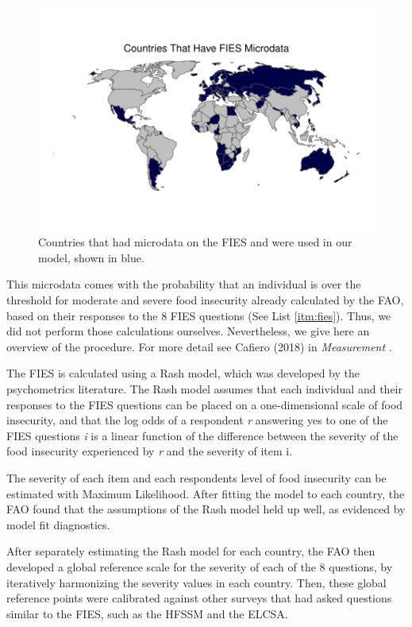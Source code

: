 \documentclass{article}
\begin{document}
\begin{figure}[H]
  \centering
  \includegraphics[width=\linewidth]{img/FIES_Countries.pdf}
  \caption{Countries that had microdata on the FIES and were used in our model, shown in blue.}
  \label{fig:fies_countries}
\end{figure}

This microdata comes with the probability that an individual is over the threshold for moderate and severe food insecurity already calculated by the FAO, based on their responses to the 8 FIES questions (See List \ref{itm:fies}).  Thus, we did not perform those calculations ourselves.  Nevertheless, we give here an overview of the procedure.  For more detail see Cafiero (2018) in \textit{Measurement} \citep{Cafiero2018}.

The FIES is calculated using a Rash model, which was developed by the psychometrics literature.  The Rash model assumes that each individual and their responses to the FIES questions can be placed on a one-dimensional scale of food insecurity, and that the log odds of a respondent \textit{r} answering yes to one of the FIES questions \textit{i} is a linear function of the difference between the severity of the food insecurity experienced by \textit{r} and the severity of item {i}.

The severity of each item and each respondents level of food insecurity can be estimated with Maximum Likelihood.  After fitting the model to each country, the FAO found that the assumptions of the Rash model held up well, as evidenced by model fit diagnostics.

After separately estimating the Rash model for each country, the FAO then developed a global reference scale for the severity of each of the 8 questions, by iteratively harmonizing the severity values in each country.  Then, these global reference points were calibrated against other surveys that had asked questions similar to the FIES, such as the HFSSM and the ELCSA.
\end{document}
